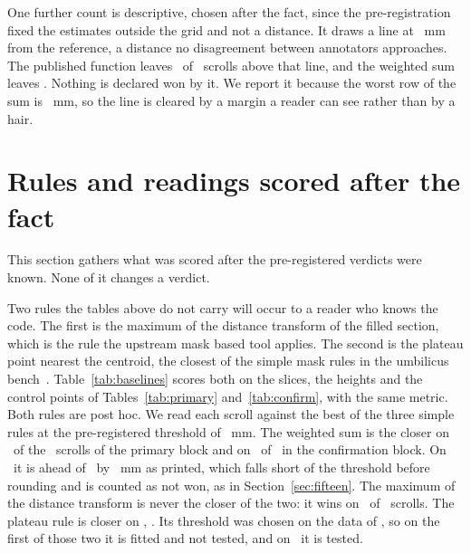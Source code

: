 One further count is descriptive, chosen after the fact, since the pre-registration fixed the
estimates outside the grid and not a distance. It draws a line at \RevTensMm~mm from the reference,
a distance no disagreement between annotators approaches. The published function leaves
\RevKAsIsTensOfMm\ of \RevKScrolls\ scrolls above that line, and the weighted sum leaves
\RevKFixedTensOfMm. Nothing is declared won by it. We report it because the worst row of the sum is
\RevKSumWorst~mm, so the line is cleared by a margin a reader can see rather than by a hair.

\section{Rules and readings scored after the fact}
\label{sec:baselines}
This section gathers what was scored after the pre-registered verdicts were known. None of it
changes a verdict.

Two rules the tables above do not carry will occur to a reader who knows the code. The first is
the maximum of the distance transform of the filled section, which is the rule the upstream mask
based tool applies. The second is the plateau point nearest the centroid, the closest of the
simple mask rules in the umbilicus bench~\cite{bench}. Table~\ref{tab:baselines} scores both on the
slices, the heights and the control points of Tables~\ref{tab:primary} and~\ref{tab:confirm}, with
the same metric. Both rules are post hoc. We read each scroll against the best of
the three simple rules at the pre-registered threshold of \UmbThresholdMm~mm. The weighted sum is
the closer on \RevBlPrimaryWon\ of the \RevBlPrimaryOf\ scrolls of the primary block and on
\RevBlConfirmWon\ of \RevBlConfirmOf\ in the confirmation block. On \RevBlNeitherOneScroll\ it is
ahead of \RevBlNeitherOneRule\ by \RevBlNeitherOneGap~mm as printed, which falls short of the
threshold before rounding and is counted as not won, as in Section~\ref{sec:fifteen}. The maximum of the distance transform is never the closer of the two: it wins on
\RevBlArgmaxBetter\ of \RevBlScrolls\ scrolls. The plateau rule is closer on \RevBlPlateauBetter,
\RevBlPlateauBetterScrolls. Its threshold was chosen on the data of \RevBlTunedScrolls, so on the
first of those two it is fitted and not tested, and on \RevBlPlateauBetterUntuned\ it is tested.

